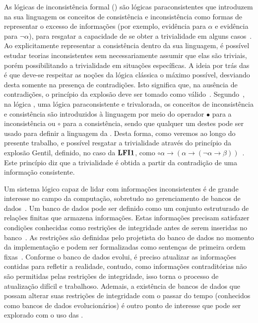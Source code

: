 As lógicas de inconsistência formal (\lfis{}) são lógicas paraconsistentes que introduzem na sua linguagem os conceitos de consistência e inconsistência como formas de representar o excesso de informações (por exemplo, evidência para $\alpha$ e evidência para $\neg \alpha$), para resgatar a capacidade de se obter a trivialidade em alguns casos~\cite{carnielli2007}. Ao explicitamente representar a consistência dentro da sua linguagem, é possível estudar teorias inconsistentes sem necessariamente assumir que elas são triviais, porém possibilitando a trivialidade em situações específicas. A ideia por trás das \lfis{} é que deve-se respeitar as noções da lógica clássica o máximo possível, desviando desta somente na presença de contradições. Isto significa que, na ausência de contradições, o princípio da explosão deve ser tomado como válido~\cite{sep-logic-paraconsistent}. Segundo~, na lógica \lfium{}, uma lógica paraconsistente e trivalorada, os conceitos de inconsistência e consistência são introduzidos à linguagem por meio do operador $\bullet$ para a inconsistência ou $\circ$ para a consistência, sendo que qualquer um destes pode ser usado para definir a linguagem da \lfium{}. Desta forma, como veremos ao longo do presente trabalho, e possível resgatar a trivialidade através do princípio da explosão Gentil, definido, no caso da $\text{{\normalfont\textbf{LFI1}}{}}$, como $\circ \alpha \to (\alpha \to (\neg \alpha \to \beta))$~\cite{carnielli2007}. Este princípio diz que a trivialidade é obtida a partir da contradição de uma informação consistente.


Um sistema lógico capaz de lidar com informações inconsistentes é de grande interesse no campo da computação, sobretudo no gerenciamento de bancos de dados~\cite{carnielli2000formal}. Um banco de dados pode ser definido como um conjunto estruturado de relações finitas que armazena informações. Estas informações precisam satisfazer condições conhecidas como restrições de integridade antes de serem inseridas no banco~\cite{Codd}. As restrições são definidas pelo projetista do banco de dados no momento da implementação e podem ser formalizadas como sentenças de primeira ordem fixas~\cite{carnielli2000formal}. Conforme o banco de dados evolui, é preciso atualizar as informações contidas para refletir a realidade, contudo, como informações contraditórias não são permitidas pelas restrições de integridade, isso torna o processo de atualização difícil e trabalhoso. Ademais, a existência de bancos de dados que possam alterar suas restrições de integridade com o passar do tempo (conhecidos como bancos de dados evolucionários) é outro ponto de interesse que pode ser explorado com o uso das \lfis{}.

